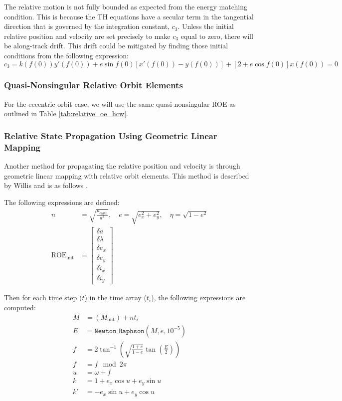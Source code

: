 The relative motion is not fully bounded as expected from the energy matching condition. This is because the TH equations have a secular term in the tangential direction that is governed by the integration constant, $c_3$. Unless the initial relative position and velocity are set precisely to make $c_3$ equal to zero, there will be along-track drift. This drift could be mitigated by finding those initial conditions from the following expression:
\[
c_3 = k(f(0)) y'(f(0)) + e \sin f(0) \left[ x'(f(0)) - y(f(0)) \right] + \left[ 2 + e \cos f(0) \right] x(f(0)) = 0
\]

\subsubsection{Quasi-Nonsingular Relative Orbit Elements}
For the eccentric orbit case, we will use the same quasi-nonsingular ROE as outlined in Table \ref{tab:relative_oe_hcw}.

\subsubsection{Relative State Propagation Using Geometric Linear Mapping}
Another method for propagating the relative position and velocity is through geometric linear mapping with relative orbit elements. This method is described by Willis and is as follows \cite{willis2023analytical}.

The following expressions are defined:
\begin{align}
n &= \sqrt{\frac{\mu_{\text{earth}}}{a^3}}, \quad
e = \sqrt{e_x^2 + e_y^2}, \quad
\eta = \sqrt{1 - e^2} \\
\text{ROE}_{\text{init}} &= 
\begin{bmatrix}
\delta a \\ \delta \lambda \\ \delta e_x \\ \delta e_y \\ \delta i_x \\ \delta i_y
\end{bmatrix}
\end{align}

Then for each time step ($t$) in the time array ($t_i$), the following expressions are computed:
\begin{align}
M &= (M_{\text{init}}) + n t_i \\
E &= \texttt{Newton\_Raphson}(M, e, 10^{-5}) \\
f &= 2 \tan^{-1} \left( \sqrt{\frac{1 + e}{1 - e}} \tan\left( \frac{E}{2} \right) \right) \\
f &= f \mod 2\pi \\
u &= \omega + f \\
k &= 1 + e_x \cos u + e_y \sin u \\
k' &= -e_x \sin u + e_y \cos u
\end{align}

